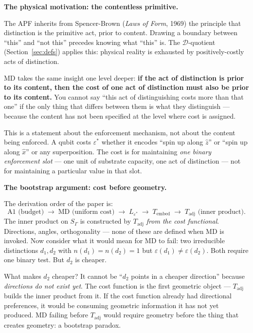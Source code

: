 \documentclass[11pt]{article}
\theoremstyle{remark}
\begin{document}
\medskip\noindent\textbf{The physical motivation: the contentless primitive.}

The APF inherits from Spencer-Brown (\emph{Laws of Form}, 1969) the principle that distinction is the primitive act, prior to content.  Drawing a boundary between ``this'' and ``not this'' precedes knowing what ``this'' is.  The $\mathcal{D}$-quotient (Section~\ref{sec:defs}) applies this: physical reality is exhausted by positively-costly acts of distinction.

MD takes the same insight one level deeper: \textbf{if the act of distinction is prior to its content, then the cost of one act of distinction must also be prior to its content.}  You cannot say ``this act of distinguishing costs more than that one'' if the only thing that differs between them is what they distinguish --- because the content has not been specified at the level where cost is assigned.

This is a statement about the enforcement mechanism, not about the content being enforced.  A qubit costs $\varepsilon^*$ whether it encodes ``spin up along $\hat{z}$'' or ``spin up along $\hat{x}$'' or any superposition.  The cost is for maintaining \emph{one binary enforcement slot} --- one unit of substrate capacity, one act of distinction --- not for maintaining a particular value in that slot.

\medskip\noindent\textbf{The bootstrap argument: cost before geometry.}

The derivation order of the paper is:
\[
\text{A1 (budget)} \;\to\; \text{MD (uniform cost)} \;\to\; L_{\varepsilon^*} \;\to\; T_{\mathrm{embed}} \;\to\; T_{\mathrm{adj}} \text{ (inner product)}.
\]
The inner product on $S_\Gamma$ is constructed by $T_{\mathrm{adj}}$ \emph{from the cost functional}.  Directions, angles, orthogonality --- none of these are defined when MD is invoked.  Now consider what it would mean for MD to fail: two irreducible distinctions $d_1, d_2$ with $n(d_1) = n(d_2) = 1$ but $\varepsilon(d_1) \ne \varepsilon(d_2)$.  Both require one binary test.  But $d_2$ is cheaper.

What makes $d_2$ cheaper?  It cannot be ``$d_2$ points in a cheaper direction'' because \emph{directions do not exist yet}.  The cost function is the first geometric object --- $T_{\mathrm{adj}}$ builds the inner product from it.  If the cost function already had directional preferences, it would be consuming geometric information it has not yet produced.  MD failing before $T_{\mathrm{adj}}$ would require geometry before the thing that creates geometry: a bootstrap paradox.
\end{document}
